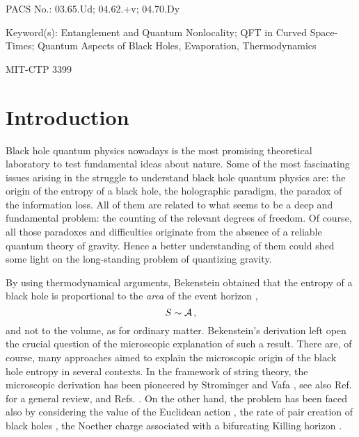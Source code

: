\bigskip
\bigskip

\noindent PACS No.: 03.65.Ud; 04.62.+v; 04.70.Dy

\noindent Keyword(s): Entanglement and Quantum Nonlocality; QFT in
Curved Space-Times; Quantum Aspects of Black Holes, Evaporation,
Thermodynamics

\vfill

MIT-CTP 3399

\newpage

\section{Introduction}
\setcounter{equation}{0}

\noindent Black hole quantum physics nowadays is the most
promising theoretical laboratory to test fundamental ideas about
nature. Some of the most fascinating issues arising in the
struggle to understand black hole quantum physics are:  the origin
of the entropy of a black hole, the holographic paradigm, the
paradox of the information loss. All of them are related to what
seems to be a deep and fundamental problem: the counting of the
relevant degrees of freedom. Of course, all those paradoxes and
difficulties originate from the absence of a reliable quantum
theory of gravity. Hence a better understanding of them could shed
some light on the long-standing problem of quantizing gravity.

\noindent By using thermodynamical arguments, Bekenstein obtained
that the entropy of a black hole is proportional to the {\it area}
of the event horizon \cite{bekenstein},
\begin{equation}\label{bekenstein}
  S \sim {\cal A} \,,
\end{equation}
and not to the volume, as for ordinary matter. Bekenstein's
derivation left open the crucial question of the microscopic
explanation of such a result. There are, of course, many
approaches aimed to explain the microscopic origin of the black
hole entropy in several contexts. In the framework of string
theory, the microscopic derivation has been pioneered by
Strominger and Vafa \cite{vafa}, see also Ref.
\cite{Bigatti:1999dp} for a general review, and Refs.
\cite{Polchinski:1996fm,krause,schwarz,Carlip:1994gy}. On the
other hand, the problem has been faced also by considering the
value of the Euclidean action \cite{Gibbons:1976ue}, the rate of
pair creation of black holes \cite{Garfinkle:xk}, the Noether
charge associated with a bifurcating Killing horizon
\cite{Wald:nt}.

